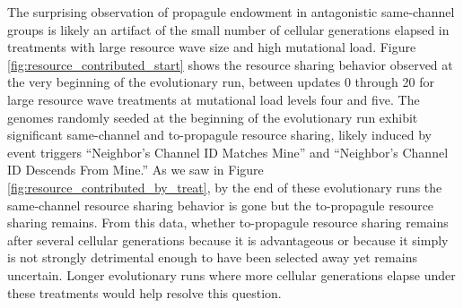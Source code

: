 The surprising observation of propagule endowment in antagonistic same-channel groups is likely an artifact of the small number of cellular generations elapsed in treatments with large resource wave size and high mutational load.
Figure \ref{fig:resource_contributed_start} shows the resource sharing behavior observed at the very beginning of the evolutionary run, between updates 0 through 20 for large resource wave treatments at mutational load levels four and five.
The genomes randomly seeded at the beginning of the evolutionary run exhibit significant same-channel and to-propagule resource sharing, likely induced by event triggers ``Neighbor's Channel ID Matches Mine'' and ``Neighbor's Channel ID Descends From Mine.''
As we saw in Figure \ref{fig:resource_contributed_by_treat}, by the end of these evolutionary runs the same-channel resource sharing behavior is gone but the to-propagule resource sharing remains.
From this data, whether to-propagule resource sharing remains after several cellular generations because it is advantageous or because it simply is not strongly detrimental enough to have been selected away yet remains uncertain.
Longer evolutionary runs where more cellular generations elapse under these treatments would help resolve this question.
